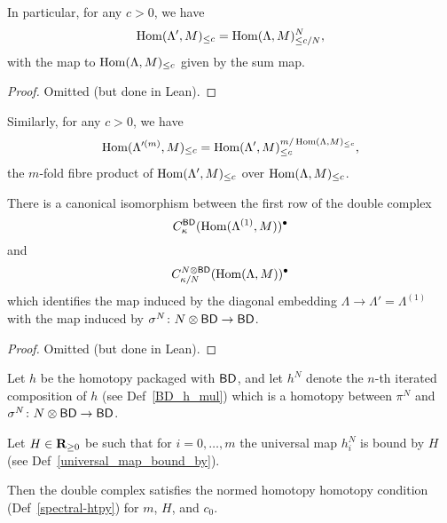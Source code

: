 \begin{lemma}
  \label{canonical_iso_1}
  \leanok
  In particular, for any $c>0$, we have
  \[
    \operatorname{Hom}(\Lambda',M)_{\leq c} = \operatorname{Hom}(\Lambda,M)_{\leq c/N}^N,
  \]
  with the map to $\operatorname{Hom}(\Lambda,M)_{\leq c}$ given by the sum map.
\end{lemma}

\begin{proof}
  \leanok
  Omitted (but done in Lean).
\end{proof}

\begin{lemma}
  \label{canonical_iso_2}
  Similarly, for any $c>0$, we have
  \[
    \operatorname{Hom}(\Lambda'^{(m)},M)_{\leq c} =
    \operatorname{Hom}(\Lambda',M)_{\leq c}^{m/\operatorname{Hom}(\Lambda,M)_{\leq c}},
  \]
  the $m$-fold fibre product of $\operatorname{Hom}(\Lambda',M)_{\leq c}$
  over $\operatorname{Hom}(\Lambda,M)_{\leq c}$.
\end{lemma}

\begin{lemma}
  \label{row_one_iso}
  \leanok
  There is a canonical isomorphism between the first row of the double complex
  \[
    C^{\mathsf{BD}}_{\kappa}(\operatorname{Hom}(\Lambda^{(1)}, M))^\bullet
  \]
  and
  \[
    C^{N \otimes \mathsf{BD}}_{\kappa/N}(\operatorname{Hom}(\Lambda, M))^\bullet
  \]
  which identifies the map induced by
  the diagonal embedding $\Lambda \to \Lambda' = \Lambda^{(1)}$
  with the map induced by $\sigma^N \colon N \otimes \mathsf{BD} \to \mathsf{BD}$.
\end{lemma}

\begin{proof}
  \leanok
  Omitted (but done in Lean).
\end{proof}

\begin{proposition}
  \label{double-complex-htpy}
  \leanok
  Let $h$ be the homotopy packaged with $\mathsf{BD}$,
  and let $h^N$ denote the $n$-th iterated composition of $h$
  (see Def~\ref{BD_h_mul})
  which is a homotopy between
  $\pi^N$ and $\sigma^N \colon N \otimes \mathsf{BD} \to \mathsf{BD}$.

  Let $H \in \mathbf{R}_{\ge 0}$ be such that for $i = 0, \dots, m$
  the universal map $h^N_i$ is bound by $H$
  (see Def~\ref{universal_map_bound_by}).

  Then the double complex satisfies
  the normed homotopy homotopy condition (Def~\ref{spectral-htpy})
  for $m$, $H$, and $c_0$.
\end{proposition}

